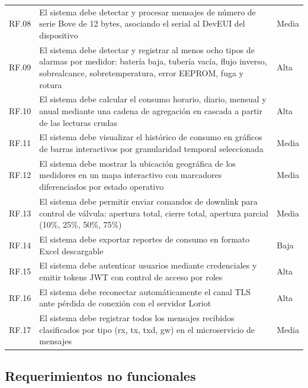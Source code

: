 \documentclass[12pt,a4paper,oneside]{report}
\begin{document}
\begin{longtable}{lp{8.5cm}l}
RF.08 & El sistema debe detectar y procesar mensajes de número de serie Bove de 12 bytes, asociando el serial al DevEUI del dispositivo & Media \\
RF.09 & El sistema debe detectar y registrar al menos ocho tipos de alarmas por medidor: batería baja, tubería vacía, flujo inverso, sobrealcance, sobretemperatura, error EEPROM, fuga y rotura & Alta \\
RF.10 & El sistema debe calcular el consumo horario, diario, mensual y anual mediante una cadena de agregación en cascada a partir de las lecturas crudas & Alta \\
RF.11 & El sistema debe visualizar el histórico de consumo en gráficos de barras interactivos por granularidad temporal seleccionada & Media \\
RF.12 & El sistema debe mostrar la ubicación geográfica de los medidores en un mapa interactivo con marcadores diferenciados por estado operativo & Media \\
RF.13 & El sistema debe permitir enviar comandos de downlink para control de válvula: apertura total, cierre total, apertura parcial (10\%, 25\%, 50\%, 75\%) & Media \\
RF.14 & El sistema debe exportar reportes de consumo en formato Excel descargable & Baja \\
RF.15 & El sistema debe autenticar usuarios mediante credenciales y emitir tokens JWT con control de acceso por roles & Alta \\
RF.16 & El sistema debe reconectar automáticamente el canal TLS ante pérdida de conexión con el servidor Loriot & Alta \\
RF.17 & El sistema debe registrar todos los mensajes recibidos clasificados por tipo (rx, tx, txd, gw) en el microservicio de mensajes & Media \\
\end{longtable}

\subsection*{Requerimientos no funcionales}
\end{document}
